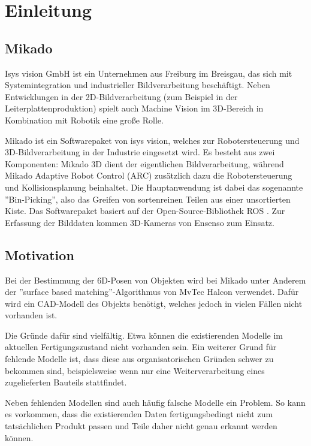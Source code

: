 
\chapter{Einleitung}
\label{ch:einleitung}


\section{Mikado}
\label{sec:mikado}

Isys vision GmbH \cite{isysWebsite} ist ein Unternehmen aus Freiburg im Breisgau, das sich mit Systemintegration und industrieller Bildverarbeitung beschäftigt.
Neben Entwicklungen in der 2D-Bildverarbeitung (zum Beispiel in der Leiterplattenproduktion) spielt auch Machine Vision im 3D-Bereich in Kombination mit Robotik eine große Rolle.


Mikado \cite{mikadoWebsite} ist ein Softwarepaket von isys vision, welches zur Robotersteuerung und 3D-Bildverarbeitung in der Industrie eingesetzt wird.
Es besteht aus zwei Komponenten: Mikado 3D dient der eigentlichen Bildverarbeitung, während Mikado Adaptive Robot Control (ARC) zusätzlich dazu die Robotersteuerung und Kollisionsplanung beinhaltet.
Die Hauptanwendung ist dabei das sogenannte ''Bin-Picking'', also das Greifen von sortenreinen Teilen aus einer unsortierten Kiste.
Das Softwarepaket basiert auf der Open-Source-Bibliothek \ac{ROS} \cite{quigley2009ros}.
Zur Erfassung der Bilddaten kommen 3D-Kameras von Ensenso \cite{ensensoWebsite} zum Einsatz.


\section{Motivation}
\label{sec:motivation}

Bei der Bestimmung der 6D-Posen von Objekten wird bei Mikado unter Anderem der ''surface based matching''-Algorithmus von MvTec Halcon \cite{drost2014recognition} verwendet.
Dafür wird ein CAD-Modell des Objekts benötigt, welches jedoch in vielen Fällen nicht vorhanden ist.

Die Gründe dafür sind vielfältig.
Etwa können die existierenden Modelle im aktuellen Fertigungszustand nicht vorhanden sein.
Ein weiterer Grund für fehlende Modelle ist, dass diese aus organisatorischen Gründen schwer zu bekommen sind, beispielsweise wenn nur eine Weiterverarbeitung eines zugelieferten Bauteils stattfindet.

Neben fehlenden Modellen sind auch häufig falsche Modelle ein Problem.
So kann es vorkommen, dass die existierenden Daten fertigungsbedingt nicht zum tatsächlichen Produkt passen und Teile daher nicht genau erkannt werden können.


